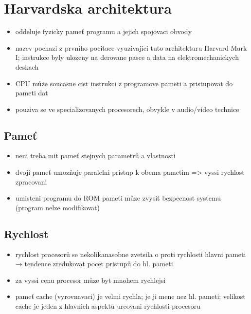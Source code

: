 \documentclass[a4paper,12pt]{article}
\begin{document}
\section{Harvardska architektura}
    \begin{itemize}
        \item{oddeluje fyzicky pameť programu a jejich spojovaci obvody}
        \item{nazev pochazi z prvniho pocitace vyuzivajici tuto architekturu Harvard Mark I; instrukce byly ulozeny na derovane pasce a data na elektromechanickych deskach}
        \item{CPU můze soucasne cist instrukci z programove pameti a pristupovat do pameti dat}
        \item{pouziva se ve specializovanych procesorech, obvykle v audio/video technice}
    \end{itemize}
    \subsection{Pameť}
        \begin{itemize}
            \item{neni treba mit pameť stejnych parametrů a vlastnosti}
            \item{dvoji pameť umozňuje paralelni pristup k obema pametim => vyssi rychlost zpracovani}
            \item{umisteni programu do ROM pameti můze zvysit bezpecnost systemu (program nelze modifikovat)}
        \end{itemize}
    \subsection{Rychlost}
        \begin{itemize}
            \item{rychlost procesorů se nekolikanasobne zvetsila o proti rychlosti hlavni pameti → tendence zredukovat pocet pristupů do hl. pameti.}
            \item{za vyssi cenu procesor můze byt mnohem rychlejsi}
            \item{pameť cache (vyrovnavaci) je velmi rychla; je ji mene nez hl. pameti; velikost cache je jeden z hlavnich aspektů urcovani rychlosti procesoru}
        \end{itemize}
\end{document}
